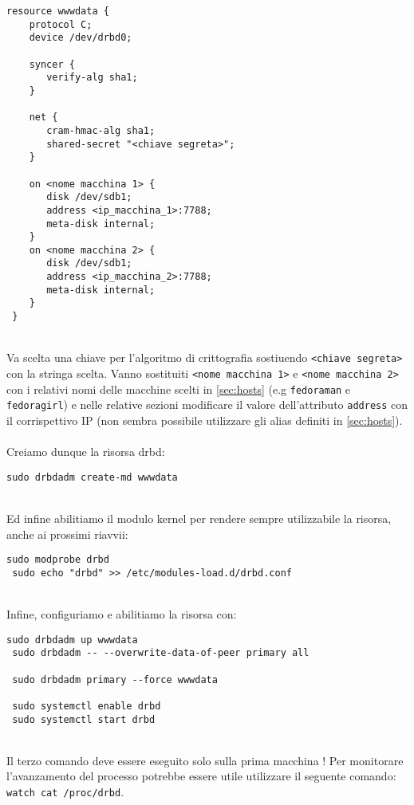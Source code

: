 \begin{lstlisting}[style=cmd]
 resource wwwdata {
    protocol C;
    device /dev/drbd0;

    syncer {
       verify-alg sha1;
    }

    net {
       cram-hmac-alg sha1;
       shared-secret "<chiave segreta>";
    }

    on <nome macchina 1> {
       disk /dev/sdb1;
       address <ip_macchina_1>:7788;
       meta-disk internal;
    }
    on <nome macchina 2> {
       disk /dev/sdb1;
       address <ip_macchina_2>:7788;
       meta-disk internal;
    }
 }
\end{lstlisting}
\ \\
Va scelta una chiave per l'algoritmo di crittografia sostiuendo \lstinline[style=cmd]|<chiave segreta>| con la stringa scelta. Vanno sostituiti \lstinline[style=cmd]|<nome macchina 1>| e \lstinline[style=cmd]|<nome macchina 2>| con i relativi nomi delle macchine scelti in \autoref{sec:hosts} (e.g \lstinline[style=cmd]|fedoraman| e \lstinline[style=cmd]|fedoragirl|) e nelle relative sezioni modificare il valore dell'attributo \lstinline[style=cmd]|address| con il corrispettivo IP (non sembra possibile utilizzare gli alias definiti in \autoref{sec:hosts}).\ \\
\ \\
Creiamo dunque la risorsa drbd:

\begin{lstlisting}[style=cmd]
 sudo drbdadm create-md wwwdata
\end{lstlisting}
\ \\
Ed infine abilitiamo il modulo kernel per rendere sempre utilizzabile la risorsa, anche ai prossimi riavvii:

\begin{lstlisting}[style=cmd]
 sudo modprobe drbd
 sudo echo "drbd" >> /etc/modules-load.d/drbd.conf
\end{lstlisting}
\ \\
Infine, configuriamo e abilitiamo la risorsa con:

\begin{lstlisting}[style=cmd]
 sudo drbdadm up wwwdata
 sudo drbdadm -- --overwrite-data-of-peer primary all
 
 sudo drbdadm primary --force wwwdata
 
 sudo systemctl enable drbd
 sudo systemctl start drbd
\end{lstlisting}
\ \\
Il terzo comando deve essere eseguito solo sulla prima macchina ! Per monitorare l'avanzamento del processo potrebbe essere utile utilizzare il seguente comando: \lstinline[style=cmd]|watch cat /proc/drbd|.


